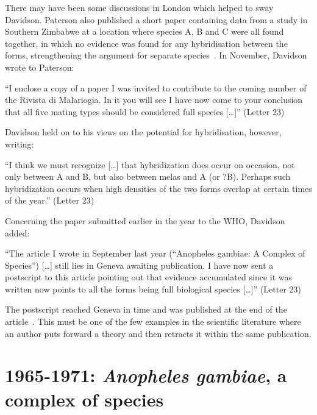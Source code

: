 \begin{refsection}
There may have been some discussions in London which helped to sway Davidson.
%
Paterson also published a short paper containing data from a study in Southern Zimbabwe at a location where species A, B and C were all found together, in which no evidence was found for any hybridisation between the forms, strengthening the argument for separate species~\parencite{Paterson1964}.
%
In November, Davidson wrote to Paterson:


\begin{displayquote}
``I enclose a copy of a paper I was invited to contribute to the coming number of the Rivista di Malariogia. In it you will see I have now come to your conclusion that all five mating types should be considered full species [\ldots]'' (Letter 23)
\end{displayquote}


Davidson held on to his views on the potential for hybridisation, however, writing:


\begin{displayquote}
``I think we must recognize [\ldots] that hybridization does occur on occasion, not only between A and B, but also between melas and A (or ?B). Perhaps such hybridization occurs when high densities of the two forms overlap at certain times of the year.'' (Letter 23)
\end{displayquote}


Concerning the paper submitted earlier in the year to the WHO, Davidson added:


\begin{displayquote}
``The article I wrote in September last year (``Anopheles gambiae: A Complex of Species'') [\ldots] still lies in Geneva awaiting publication. I have now sent a postscript to this article pointing out that evidence accumulated since it was written now points to all the forms being full biological species [\ldots]'' (Letter 23)
\end{displayquote}


The postscript reached Geneva in time and was published at the end of the article~\parencite{Davidson1964}.
%
This must be one of the few examples in the scientific literature where an author puts forward a theory and then retracts it within the same publication.


\section{1965-1971: \textit{Anopheles gambiae}, a complex of species}\label{sec:1965-1971}



\end{refsection}
